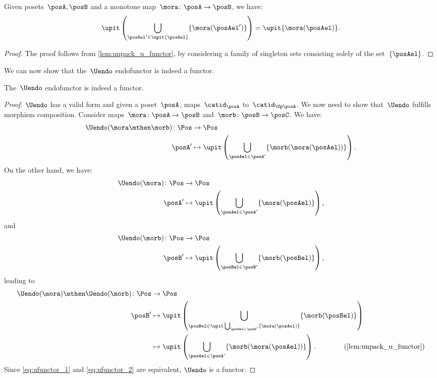 \begin{lemma}
  \label{lem:unpack_part_2}
  Given posets~$\posA,\posB$ and a monotone map~$\mora\colon \posA\to \posB$, we have:
  \begin{equation}
    \upit \left( \bigcup_{\posAel'\in \upit \{\posAel\}} \{\mora(\posAel')\}\right)=\upit \{\mora(\posAel)\}.
  \end{equation}
\end{lemma}
\begin{proof}
  The proof follows from \cref{lem:unpack_u_functor}, by considering a family of singleton sets consisting solely of the set~$\{\posAel\}$.
\end{proof}
We can now show that the~$\Uendo$ endofunctor is indeed a functor.
\begin{lemma}
  The~$\Uendo$ endofunctor is indeed a functor.
\end{lemma}
\begin{proof}
  $\Uendo$ has a valid form and given a poset~$\posA$, maps~$\catid_\posA$ to~$\catid_{\Up \posA}$.
  We now need to show that~$\Uendo$ fulfills morphism composition. Consider maps~$\mora\colon \posA \to \posB$ and~$\morb\colon \posB \to \posC$. We have:
  \begin{equation}
    \label{eq:ufunctor_1}
    \begin{aligned}
      \Uendo(\mora\mthen \morb)\colon \Pos &\to \Pos\\
      \posA'&\mapsto \upit \left( \bigcup_{\posAel\in \posA'} \{\morb(\mora(\posAel))\}\right).
    \end{aligned}
  \end{equation}
  On the other hand, we have:
  \begin{equation}
    \begin{aligned}
      \Uendo(\mora)\colon \Pos &\to \Pos\\
      \posA'&\mapsto \upit \left( \bigcup_{\posAel\in \posA'}\{\mora(\posAel)\}\right),
    \end{aligned}
  \end{equation}
  and
  \begin{equation}
    \begin{aligned}
      \Uendo(\morb)\colon \Pos &\to \Pos\\
      \posB'&\mapsto \upit \left( \bigcup_{\posBel\in \posB'}\{\morb(\posBel)\}\right),
    \end{aligned}
  \end{equation}
  leading to
  \begin{equation}
    \label{eq:ufunctor_2}
    \begin{aligned}
      \Uendo(\mora)\mthen \Uendo(\morb)\colon \Pos &\to \Pos\\
      \posB'&\mapsto \upit\left( \bigcup_{\posBel\in \upit \bigcup_{\posAel\in \posB'}\{\mora(\posAel)\}}\{\morb(\posBel)\}\right)\\
      &\mapsto \upit \left(\bigcup_{\posAel\in \posA'} \{ \morb(\mora(\posAel))\}\right). \qquad \qquad (\cref{lem:unpack_u_functor})
    \end{aligned}
  \end{equation}
  Since \cref{eq:ufunctor_1} and \cref{eq:ufunctor_2} are equivalent, $\Uendo$ is a functor.
\end{proof}
